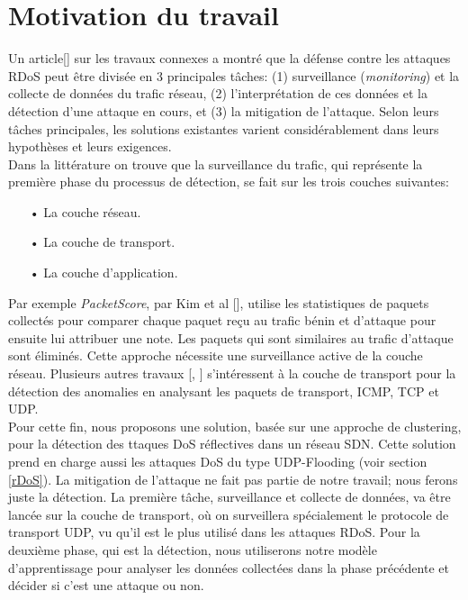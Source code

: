\section{Motivation du travail}
Un article[\cite{24}] sur les travaux connexes a montré que la défense contre les attaques RDoS peut être divisée en 3 principales tâches: (1) surveillance (\textit{monitoring}) et la collecte de données du trafic réseau, (2) l’interprétation de ces données et la détection d’une attaque en cours, et (3) la mitigation de l’attaque. Selon leurs tâches principales, les solutions existantes varient considérablement dans leurs hypothèses et leurs exigences.\\
Dans la littérature on trouve que la surveillance du trafic, qui représente la première phase du processus de détection, se fait sur les trois couches suivantes:\\
\begin{itemize}
\item[•] La couche réseau.
\item[•] La couche de transport.
\item[•] La couche d'application.\\
\end{itemize}
\newpage
Par exemple \textit{PacketScore}, par Kim et al [\cite{25}], utilise les statistiques de paquets collectés pour comparer chaque paquet reçu au trafic bénin et d’attaque pour ensuite lui attribuer une note. Les paquets qui sont similaires au trafic d’attaque sont éliminés. Cette approche nécessite une surveillance active de la couche réseau. Plusieurs autres travaux [\cite{26}, \cite{27}] s'intéressent à la couche de transport pour la détection des anomalies en analysant les paquets de transport, ICMP, TCP et UDP.\\

Pour cette fin, nous proposons une solution, basée sur une approche de clustering, pour la détection des ttaques DoS réflectives dans un réseau SDN. Cette solution prend en charge aussi les attaques DoS du type UDP-Flooding (voir section \ref{rDoS}). La mitigation de l'attaque ne fait pas partie de notre travail; nous ferons juste la détection. La première tâche, surveillance et collecte de données, va être lancée sur la couche de transport, où on surveillera spécialement le protocole de transport UDP, vu qu'il est le plus utilisé dans les attaques RDoS. Pour la deuxième phase, qui est la détection, nous utiliserons notre modèle d'apprentissage pour analyser les données collectées dans la phase précédente et décider si c'est une attaque ou non.

